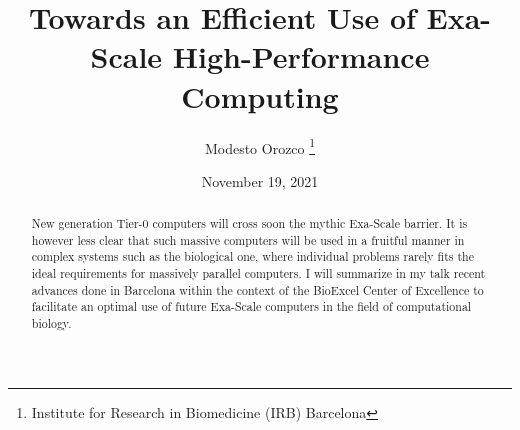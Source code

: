 \documentclass{article}
\title{Towards an Efficient Use of Exa-Scale High-Performance Computing}
\author{Modesto Orozco \thanks{Institute for Research in Biomedicine (IRB) Barcelona}}
\date{November 19, 2021}
\providecommand{\keywords}[1]{\textbf{\textit{Keywords---}} #1}
\begin{document}
\maketitle

\begin{abstract}
    New generation Tier-0 computers will cross soon the mythic Exa-Scale barrier. 
    It is however less clear that such massive computers will be used in a fruitful
    manner in complex systems such as the biological one, where individual problems
    rarely fits the ideal requirements for massively parallel computers. 
    I will summarize in my talk recent advances done in Barcelona within the context
    of the BioExcel Center of Excellence to facilitate an optimal use of future 
    Exa-Scale computers in the field of computational biology.
\end{abstract}

\end{document}
